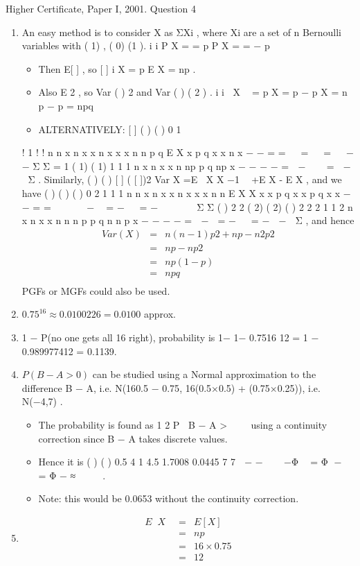 \documentclass[a4paper,12pt]{article}
\begin{document}
Higher Certificate, Paper I, 2001. Question 4
\begin{enumerate}
\item An easy method is to consider X as ΣXi , where Xi are a set of n Bernoulli variables
with ( 1) , ( 0) (1 ). i i P X = = p P X = = − p
\begin{itemize}
\item Then E[ ] , so [ ] i X = p E X = np .
\item Also E 2 , so Var ( ) 2 and Var ( ) ( 2 ) . i i X  = p X = p − p X = n p − p = npq
\item ALTERNATIVELY: [ ] ( ) ( ) 0 1

\end{itemize}
!
1 ! !
n n x n x
x n x
x x
n n p q E X x p q
x x n x
−
−
= =
 
=   =   − −
Σ Σ
= 1 ( 1) ( 1)
1
1
1
n
x n x
x
n
np p q np
x
− − − −
=
 − 
  =  − 
Σ .
Similarly, ( ) ( ) [ ] ( [ ])2 Var X =E X X −1  +E X - E X , and we have
( ) ( ) ( )
0 2
1 1 1
n n
x n x x n x
x x
n n
E X X x x p q x x p q
x x
− −
= =
   
 −  = −   = −  
   
Σ Σ
( ) 2 2 ( 2) ( 2) ( ) 2
2
2
1 1
2
n
x n x
x
n
n n p p q n n p
x
− − − −
=
 − 
= −   = −  − 
Σ ,
and hence 
\begin{eqnarray*}
Var (X) &=& n(n −1) p2 + np − n2 p2 \\
&=& np − np2\\ 
&=& np(1-p) \\
&=& npq \\
\end{eqnarray*}
PGFs or MGFs could also be used.
\item  $0.75^{16} \approx 0.0100226 = 0.0100$ approx.
\item 1 − P(no one gets all 16 right), probability is { }1− 1− 0.7516 12
= 1 − {0.9899774}12 = 0.1139.
\item $P(B − A > 0)$ can be studied using a Normal approximation to the difference
B − A, i.e. N(16{0.5 − 0.75}, 16{(0.5×0.5) + (0.75×0.25)}), i.e. N(−4,7) .
\begin{itemize}
    \item The probability is found as 1
2
P B − A > 
 
using a continuity correction since B − A
takes discrete values.
\item Hence it is ( ) ( ) 0.5 4 1 4.5 1.7008 0.0445
7 7
 − −    −Φ  = Φ −  = Φ − ≈
   
.
\item Note: this would be 0.0653 without the continuity correction.
\end{itemize}

\item 
\begin{eqnarray*}
E X  &=& E[X ] \\
&=& np \\
&=& 16\times 0.75 \\
&=& 12 
\end{eqnarray*}


\end{enumerate}
\end{document}
